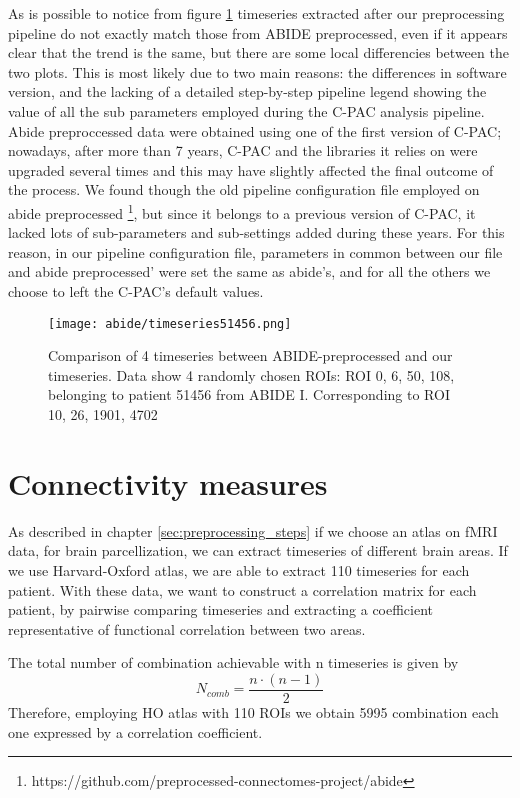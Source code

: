 \documentclass[11pt]{report}
\begin{document}
As is possible to notice from figure \ref{fig:confrontoabidepreproc} timeseries extracted after our preprocessing pipeline do not exactly match those from ABIDE preprocessed, even if it appears clear that the trend is the same, but there are some local differencies between the two plots.
This is most likely due to two main reasons: the differences in software version, and the lacking of a detailed step-by-step pipeline legend showing the value of all the sub parameters employed during the C-PAC analysis pipeline.
Abide preproccessed data were obtained using one of the first version of C-PAC; nowadays, after more than 7 years, C-PAC and the libraries it relies on were upgraded several times and this may have slightly affected the final outcome of the process.
We found though the old pipeline configuration file employed on abide preprocessed \footnote{https://github.com/preprocessed-connectomes-project/abide}, but since it belongs to a previous version of C-PAC, it lacked lots of sub-parameters and sub-settings added during these years.
For this reason, in our pipeline configuration file, parameters in common between our file and abide preprocessed' were set the same as abide's, and for all the others we choose to left the C-PAC's default values.

\begin{figure}[h]
\centering
\texttt{[image: abide/timeseries51456.png]}
\caption{Comparison of 4 timeseries between ABIDE-preprocessed and our timeseries. Data show 4 randomly chosen ROIs: ROI 0, 6, 50, 108, belonging to patient 51456 from ABIDE I. Corresponding to ROI 10, 26, 1901, 4702}
\label{fig:confrontoabidepreproc}
\end{figure}




\chapter{Connectivity measures}\label{chap:connectivity_coefficients}
As described in chapter \ref{sec:preprocessing_steps} if we choose an atlas on fMRI data, for brain parcellization, we can extract timeseries of different brain areas. If we use Harvard-Oxford atlas, we are able to extract 110 timeseries for each patient.
With these data, we want to construct a correlation matrix for each patient, by pairwise comparing timeseries and extracting a coefficient representative of functional correlation between two areas.

The total number of combination achievable with n timeseries is given by
\begin{equation}
N_{comb} = \frac{n\cdot(n-1)}{2}
\end{equation}
Therefore, employing HO atlas with 110 ROIs we obtain 5995 combination each one expressed by a correlation coefficient.
\end{document}
